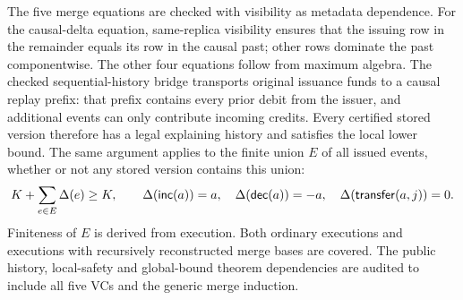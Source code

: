 \begin{example}
The five merge equations are checked with visibility as metadata dependence.
For the causal-delta equation, same-replica visibility ensures that the issuing
row in the remainder equals its row in the causal past; other rows dominate
the past componentwise. The other four equations follow from maximum algebra.
The checked sequential-history bridge transports original issuance funds to a
causal replay prefix: that prefix contains every prior debit from the issuer,
and additional events can only contribute incoming credits. Every certified
stored version therefore has a legal explaining history and satisfies the
local lower bound. The same argument applies to the finite union $E$ of all
issued events, whether or not any stored version contains this union:
\[
 K+\sum_{e\in E}\Delta(e)\ge K,\qquad
 \Delta(\mathsf{inc}(a))=a,\quad \Delta(\mathsf{dec}(a))=-a,\quad
 \Delta(\mathsf{transfer}(a,j))=0.
\]
Finiteness of $E$ is derived from execution. Both ordinary executions and
executions with recursively reconstructed merge bases are covered. The public
history, local-safety and global-bound theorem dependencies are audited to
include all five VCs and the generic merge induction.
\end{example}

